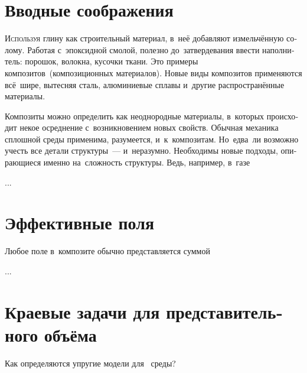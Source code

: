 

\thispagestyle{empty}

\label{chapter:composites}

\begin{otherlanguage}{russian}

\section{Вводные соображения}

\lettrine[lines=2, findent=2pt, nindent=0pt]{И}{спользуя} глину как строительный материал, в~неё добавляют измельчённую солому. Работая с~эпоксидной смолой, полезно до~затвердевания ввести наполнитель: порошок, волокна, кусочки ткани. Это примеры композитов~(композиционных материалов). Новые виды композитов применяются всё~шире, вытесняя сталь, алюминиевые сплавы и~другие распространённые материалы.

Композиты можно определить как неоднородные материалы, в~которых происходит некое осреднение с~возникновением новых свойств. Обычная механика сплошной среды применима, разумеется, и~к~композитам. Но~едва~ли возможно учесть все детали структуры~--- и~неразумно. Необходимы новые подходы, опирающиеся именно на~сложность структуры. Ведь, например, в~газе

...



\section{Эффективные поля}

Любое поле в~композите обычно представляется суммой

...



\section{Краевые задачи для представительного объёма}

Как определяются упругие модели для~ среды?


\end{otherlanguage}
